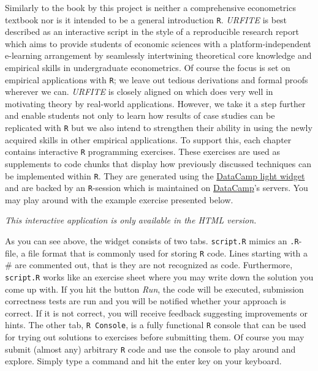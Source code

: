\documentclass[]{book}
\theoremstyle{definition}
\theoremstyle{definition}
\theoremstyle{definition}
\theoremstyle{remark}
\begin{document}
Similarly to the book by \citet{heiss2016} this project is neither a
comprehensive econometrics textbook nor is it intended to be a general
introduction \texttt{R}. \emph{URFITE} is best described as an
interactive script in the style of a reproducible research report which
aims to provide students of economic sciences with a
platform-independent e-learning arrangement by seamlessly intertwining
theoretical core knowledge and empirical skills in undergraduate
econometrics. Of course the focus is set on empirical applications with
\texttt{R}; we leave out tedious derivations and formal proofs wherever
we can. \emph{URFITE} is closely aligned on \citet{stock2015} which does
very well in motivating theory by real-world applications. However, we
take it a step further and enable students not only to learn how results
of case studies can be replicated with \texttt{R} but we also intend to
strengthen their ability in using the newly acquired skills in other
empirical applications. To support this, each chapter contains
interactive \texttt{R} programming exercises. These exercises are used
as supplements to code chunks that display how previously discussed
techniques can be implemented within \texttt{R}. They are generated
using the \href{https://github.com/datacamp/datacamp-light}{DataCamp
light widget} and are backed by an \texttt{R}-session which is
maintained on \href{https://www.datacamp.com/home}{DataCamp}'s servers.
You may play around with the example exercise presented below.

\begin{center}\textit{This interactive application is only available in the HTML version.}\end{center}

As you can see above, the widget consists of two tabs. \texttt{script.R}
mimics an \texttt{.R}-file, a file format that is commonly used for
storing \texttt{R} code. Lines starting with a \# are commented out,
that is they are not recognized as code. Furthermore, \texttt{script.R}
works like an exercise sheet where you may write down the solution you
come up with. If you hit the button \emph{Run}, the code will be
executed, submission correctness tests are run and you will be notified
whether your approach is correct. If it is not correct, you will receive
feedback suggesting improvements or hints. The other tab,
\texttt{R Console}, is a fully functional \texttt{R} console that can be
used for trying out solutions to exercises before submitting them. Of
course you may submit (almost any) arbitrary \texttt{R} code and use the
console to play around and explore. Simply type a command and hit the
enter key on your keyboard.
\end{document}
